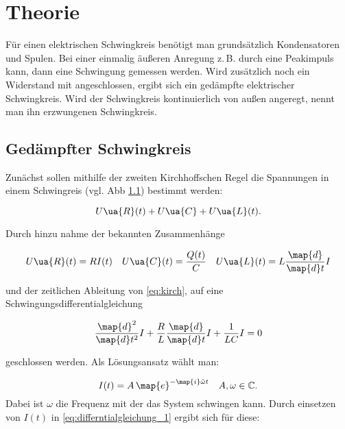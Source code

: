\setcounter{page}{1}

\section{Theorie}

Für einen elektrischen Schwingkreis benötigt man grundsätzlich
Kondensatoren und Spulen.
Bei einer einmalig äußeren Anregung z.\,B. durch eine Peakimpuls
kann, dann eine Schwingung gemessen werden.
Wird zusätzlich noch ein Widerstand mit angeschlossen, ergibt sich ein
gedämpfte elektrischer Schwingkreis.
Wird der Schwingkreis kontinuierlich von außen angeregt, nennt man
ihn erzwungenen Schwingkreis.

\subsection{Gedämpfter Schwingkreis}

Zunächst sollen mithilfe der zweiten
Kirchhoffschen Regel die Spannungen in einem Schwingreis (vgl. Abb \ref{})
bestimmt werden:

\begin{equation}
  \label{eq:kirch}
U\ua{R}(t)+U\ua{C}+U\ua{L}(t).
\end{equation}

Durch hinzu nahme der bekannten Zusammenhänge

\begin{equation*}
U\ua{R}(t)=RI(t) \quad U\ua{C}(t)=\frac{Q(t)}{C} \quad U\ua{L}(t)=L\frac{\map{d}}{\map{d}t}I
\end{equation*}

und der zeitlichen Ableitung von \eqref{eq:kirch}, auf eine Schwingungsdifferentialgleichung

\begin{equation}
  \label{eq:differntialgleichung_1}
\frac{\map{d}^2}{\map{d}t^2}I+\frac{R}{L}\frac{\map{d}}{\map{d}t}I+\frac{1}{LC}I=0
\end{equation}

geschlossen werden.
Als Lösungsansatz wählt man:

\begin{equation*}
  I(t)=A\,\map{e}^{-\map{i}\hat{\omega} t} \quad A,\omega\in\mathbb{C}.
\end{equation*}
Dabei ist $\omega$ die Frequenz mit der das System schwingen kann.
Durch einsetzen von $I(t)$ in \eqref{eq:differntialgleichung_1} ergibt sich
für diese:

